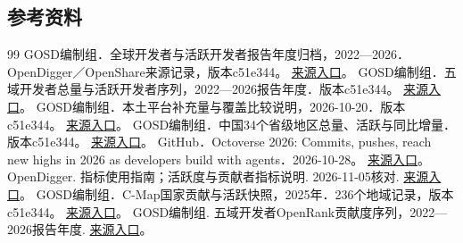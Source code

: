 \documentclass[UTF8,fontset=none,11pt,a4paper]{ctexart}
\begin{document}
\subsection*{参考资料}
\begingroup\fontsize{9.8}{14.0}\selectfont\renewcommand{\section}[2]{}\begin{thebibliography}{99}\setlength{\itemsep}{5pt}\setlength{\parskip}{0pt}
 GOSD编制组．全球开发者与活跃开发者报告年度归档，2022—2026．OpenDigger／OpenShare来源记录，版本c51e344。 \href{https://github.com/X-lab2017/2026-Global-Open-Source-Development-Report/blob/c51e3441361407b68f10b339d97eff288319b503/preview/content/vmap/source/README.md}{来源入口}。
 GOSD编制组．五域开发者总量与活跃开发者序列，2022—2026报告年度．版本c51e344。 \href{https://github.com/X-lab2017/2026-Global-Open-Source-Development-Report/blob/c51e3441361407b68f10b339d97eff288319b503/data/processed/chapter2/fig-2-1-3_five_region_active_developers_trend.csv}{来源入口}。
 GOSD编制组．本土平台补充量与覆盖比较说明，2026-10-20．版本c51e344。 \href{https://github.com/X-lab2017/2026-Global-Open-Source-Development-Report/blob/c51e3441361407b68f10b339d97eff288319b503/preview/docs/vmap-publication-revision-20261020.md}{来源入口}。
 GOSD编制组．中国34个省级地区总量、活跃与同比增量．版本c51e344。 \href{https://github.com/X-lab2017/2026-Global-Open-Source-Development-Report/blob/c51e3441361407b68f10b339d97eff288319b503/preview/content/vmap/fig-2-1-3_china-provinces.csv}{来源入口}。
 GitHub．Octoverse 2026: Commits, pushes, reach new highs in 2026 as developers build with agents．2026-10-28。 \href{https://github.blog/news-insights/octoverse/octoverse-commits-pushes-reach-new-highs-in-2026-as-developers-build-with-agents/}{来源入口}。
 OpenDigger. 指标使用指南；活跃度与贡献者指标说明. 2026-11-05核对. \href{https://open-digger.cn/docs/user-docs/metrics/metrics-usage-guide}{来源入口}。
 GOSD编制组．C-Map国家贡献与活跃快照，2025年．236个地域记录，版本c51e344。 \href{https://github.com/X-lab2017/2026-Global-Open-Source-Development-Report/blob/c51e3441361407b68f10b339d97eff288319b503/preview/content/cmap/countries.csv}{来源入口}。
 GOSD编制组. 五域开发者OpenRank贡献度序列，2022—2026报告年度. \href{https://github.com/X-lab2017/2026-Global-Open-Source-Development-Report/blob/c51e3441361407b68f10b339d97eff288319b503/data/processed/chapter2/fig-2-2-2_five_region_openrank_contribution_trend.csv}{来源入口}。

\end{thebibliography}
\end{document}
